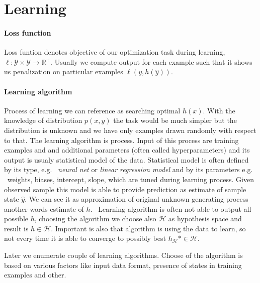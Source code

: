 \section{Learning}

\paragraph{Loss function}
Loss funtion denotes objective of our optimization task during learning, $\ell: \mathcal{Y} \times \mathcal{Y} \rightarrow \mathbb{R}^{+}$. Usually we compute output for each example such that it shows us penalization on particular examples $\ell(y, h(\hat{y}))$.

\paragraph{Learning algorithm}
Process of learning we can reference as searching optimal $h(x)$. With the knowledge of distribution $p(x,y)$ the task would be much simpler but the distribution is unknown and we have only examples drawn randomly with respect to that. The learning algorithm is process. Input of this process are training examples and and additional parameters (often called hyperparameters) and its output is usualy statistical model of the data. Statistical model is often defined by its type, e.g. \ \emph{neural net} or \emph{linear regression model} and by its parameters e.g. \ weights, biases, intercept, slope, which are tuned during learning process. Given observed sample this model is able to provide prediction as estimate of sample state $\hat{y}$. We can see it as approximation of original unknown generating process another words estimate of $h$. \
Learning algorithm is often not able to output all possible $h$, choosing the algorithm we choose also $\mathcal{H}$ as hypothesis space and result is $h \in \mathcal{H}$. Important is also that algorithm is using the data to learn, so not every time it is able to converge to possibly best $h_{\mathcal{H}}* \in \mathcal{H}$.

Later we enumerate couple of learning algorithms. Choose of the algorithm is based on various factors like input data format, presence of states in training examples and other.


